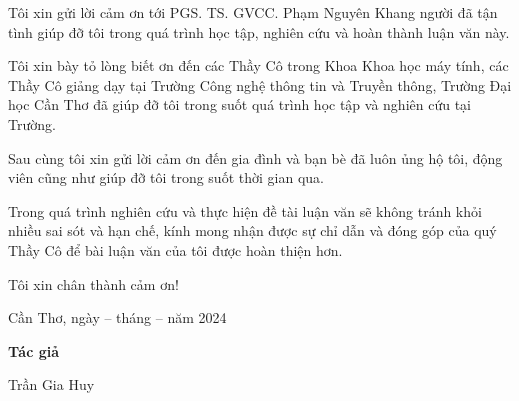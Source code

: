 Tôi xin gửi lời cảm ơn tới PGS. TS. GVCC. Phạm Nguyên Khang người đã tận tình giúp đỡ tôi trong quá trình học tập, nghiên cứu và hoàn thành luận văn này.

Tôi xin bày tỏ lòng biết ơn đến các Thầy Cô trong Khoa Khoa học máy tính, các Thầy Cô giảng dạy tại Trường Công nghệ thông tin và Truyền thông, Trường Đại học Cần Thơ đã giúp đỡ tôi trong suốt quá trình học tập và nghiên cứu tại Trường.

Sau cùng tôi xin gửi lời cảm ơn đến gia đình và bạn bè đã luôn ủng hộ tôi, động viên cũng như giúp đỡ tôi trong suốt thời gian qua.

Trong quá trình nghiên cứu và thực hiện đề tài luận văn sẽ không tránh khỏi nhiều sai sót và hạn chế, kính mong nhận được sự chỉ dẫn và đóng góp của quý Thầy Cô để bài luận văn của tôi được hoàn thiện hơn.

Tôi xin chân thành cảm ơn!

\begin{multicols}{2}
    \begin{minipage}{\linewidth}
    \end{minipage}

    \begin{minipage}{\linewidth}
        \begin{center}
            Cần Thơ, ngày -- tháng -- năm 2024 %

            \textbf{Tác giả}

            \vspace{2.5cm}

            Trần Gia Huy
        \end{center}
    \end{minipage}
\end{multicols}